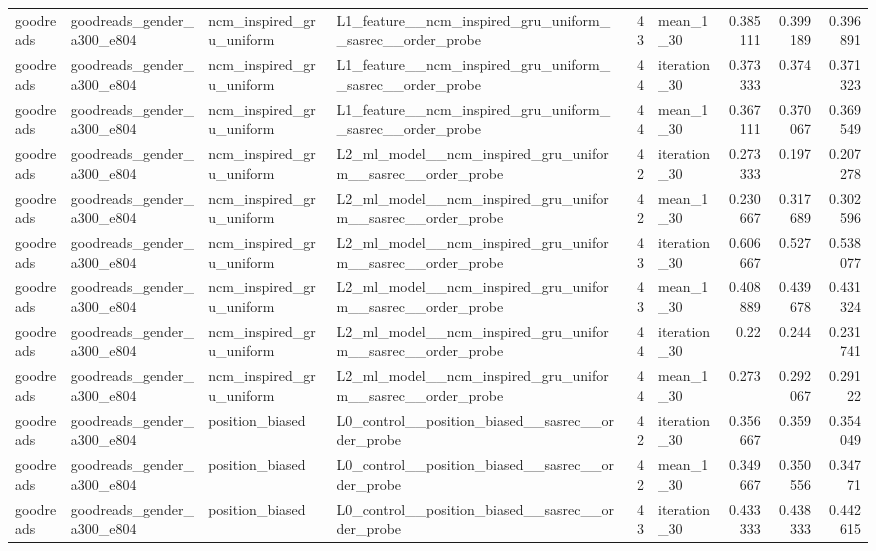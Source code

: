 \begin{table}[htbp!]
\begin{tabular}{llllrlrrr}
goodreads & goodreads\_gender\_a300\_e804 & ncm\_inspired\_gru\_uniform & L1\_feature\_\_ncm\_inspired\_gru\_uniform\_\_sasrec\_\_order\_probe & 43 & mean\_1\_30 & 0.385111 & 0.399189 & 0.396891 \\
goodreads & goodreads\_gender\_a300\_e804 & ncm\_inspired\_gru\_uniform & L1\_feature\_\_ncm\_inspired\_gru\_uniform\_\_sasrec\_\_order\_probe & 44 & iteration\_30 & 0.373333 & 0.374 & 0.371323 \\
goodreads & goodreads\_gender\_a300\_e804 & ncm\_inspired\_gru\_uniform & L1\_feature\_\_ncm\_inspired\_gru\_uniform\_\_sasrec\_\_order\_probe & 44 & mean\_1\_30 & 0.367111 & 0.370067 & 0.369549 \\
goodreads & goodreads\_gender\_a300\_e804 & ncm\_inspired\_gru\_uniform & L2\_ml\_model\_\_ncm\_inspired\_gru\_uniform\_\_sasrec\_\_order\_probe & 42 & iteration\_30 & 0.273333 & 0.197 & 0.207278 \\
goodreads & goodreads\_gender\_a300\_e804 & ncm\_inspired\_gru\_uniform & L2\_ml\_model\_\_ncm\_inspired\_gru\_uniform\_\_sasrec\_\_order\_probe & 42 & mean\_1\_30 & 0.230667 & 0.317689 & 0.302596 \\
goodreads & goodreads\_gender\_a300\_e804 & ncm\_inspired\_gru\_uniform & L2\_ml\_model\_\_ncm\_inspired\_gru\_uniform\_\_sasrec\_\_order\_probe & 43 & iteration\_30 & 0.606667 & 0.527 & 0.538077 \\
goodreads & goodreads\_gender\_a300\_e804 & ncm\_inspired\_gru\_uniform & L2\_ml\_model\_\_ncm\_inspired\_gru\_uniform\_\_sasrec\_\_order\_probe & 43 & mean\_1\_30 & 0.408889 & 0.439678 & 0.431324 \\
goodreads & goodreads\_gender\_a300\_e804 & ncm\_inspired\_gru\_uniform & L2\_ml\_model\_\_ncm\_inspired\_gru\_uniform\_\_sasrec\_\_order\_probe & 44 & iteration\_30 & 0.22 & 0.244 & 0.231741 \\
goodreads & goodreads\_gender\_a300\_e804 & ncm\_inspired\_gru\_uniform & L2\_ml\_model\_\_ncm\_inspired\_gru\_uniform\_\_sasrec\_\_order\_probe & 44 & mean\_1\_30 & 0.273 & 0.292067 & 0.29122 \\
goodreads & goodreads\_gender\_a300\_e804 & position\_biased & L0\_control\_\_position\_biased\_\_sasrec\_\_order\_probe & 42 & iteration\_30 & 0.356667 & 0.359 & 0.354049 \\
goodreads & goodreads\_gender\_a300\_e804 & position\_biased & L0\_control\_\_position\_biased\_\_sasrec\_\_order\_probe & 42 & mean\_1\_30 & 0.349667 & 0.350556 & 0.34771 \\
goodreads & goodreads\_gender\_a300\_e804 & position\_biased & L0\_control\_\_position\_biased\_\_sasrec\_\_order\_probe & 43 & iteration\_30 & 0.433333 & 0.438333 & 0.442615 \\

\end{tabular}
\end{table}
